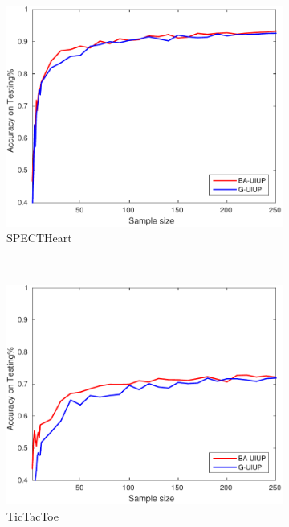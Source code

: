 \begin{figure}[ht]
\begin{subfigure}[b]{0.3\textwidth}
		\centering
  	\includegraphics[width=\textwidth]{figs/PLPTF/Trees/SpectHeartDownsampledFurther_Trees_X_MH.pdf}
  	\caption{SPECTHeart}
		\label{fig:S1}
	\end{subfigure}
  \\
  \begin{subfigure}[b]{0.3\textwidth}
		\centering
  	\includegraphics[width=\textwidth]{figs/PLPTF/Trees/TicTacToe_Trees_X_MH.pdf}
  	\caption{TicTacToe}
		\label{fig:T1}
	\end{subfigure}
  \begin{subfigure}[b]{0.3\textwidth}
		\centering

\end{subfigure}
\end{figure}
